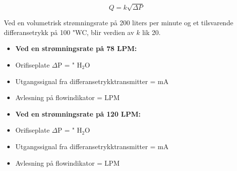 
$$Q = k \sqrt{\Delta P}$$

Ved en volumetrisk strømningsrate på 200 liters per minute og et tilsvarende differansetrykk på 100 "WC, blir verdien av $k$ lik 20.

\begin{itemize}
\item {} {\bf Ved en strømningsrate på 78 LPM:}
\vskip 5pt
\item{} Orifiseplate $\Delta$P =  " H$_{2}$O
\vskip 5pt
\item{} Utgangssignal fra differansetrykktransmitter =  mA
\vskip 5pt
\item{} Avlesning på flowindikator =  LPM
\end{itemize}

\vskip 10pt

\begin{itemize}
\item {} {\bf Ved en strømningsrate på 120 LPM:}
\vskip 5pt
\item{} Orifiseplate $\Delta$P =  " H$_{2}$O
\vskip 5pt
\item{} Utgangssignal fra differansetrykktransmitter =  mA
\vskip 5pt
\item{} Avlesning på flowindikator =  LPM
\end{itemize}













